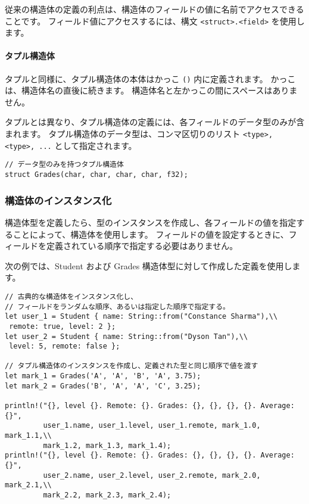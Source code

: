 従来の構造体の定義の利点は、構造体のフィールドの値に名前でアクセスできることです。 フィールド値にアクセスするには、構文 \texttt{<struct>.<field>} を使用します。

\paragraph{タプル構造体}

タプルと同様に、タプル構造体の本体はかっこ \texttt{()} 内に定義されます。 かっこは、構造体名の直後に続きます。 構造体名と左かっこの間にスペースはありません。

タプルとは異なり、タプル構造体の定義には、各フィールドのデータ型のみが含まれます。 タプル構造体のデータ型は、コンマ区切りのリスト \texttt{<type>, <type>, ...} として指定されます。

\begin{lstlisting}[numbers=none]
// データ型のみを持つタプル構造体
struct Grades(char, char, char, char, f32);
\end{lstlisting}

\subsubsection{構造体のインスタンス化}

構造体型を定義したら、型のインスタンスを作成し、各フィールドの値を指定することによって、構造体を使用します。 フィールドの値を設定するときに、フィールドを定義されている順序で指定する必要はありません。

次の例では、Student および Grades 構造体型に対して作成した定義を使用します。

\begin{lstlisting}[numbers=none]
// 古典的な構造体をインスタンス化し、
// フィールドをランダムな順序、あるいは指定した順序で指定する。
let user_1 = Student { name: String::from("Constance Sharma"),\\
 remote: true, level: 2 };
let user_2 = Student { name: String::from("Dyson Tan"),\\
 level: 5, remote: false };

// タプル構造体のインスタンスを作成し、定義された型と同じ順序で値を渡す
let mark_1 = Grades('A', 'A', 'B', 'A', 3.75);
let mark_2 = Grades('B', 'A', 'A', 'C', 3.25);

println!("{}, level {}. Remote: {}. Grades: {}, {}, {}, {}. Average: {}", 
         user_1.name, user_1.level, user_1.remote, mark_1.0, mark_1.1,\\
         mark_1.2, mark_1.3, mark_1.4);
println!("{}, level {}. Remote: {}. Grades: {}, {}, {}, {}. Average: {}", 
         user_2.name, user_2.level, user_2.remote, mark_2.0, mark_2.1,\\
         mark_2.2, mark_2.3, mark_2.4);
\end{lstlisting}

